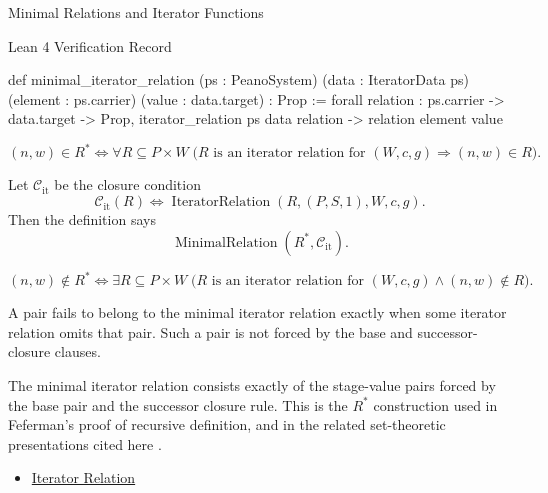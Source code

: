 \begin{topicbox}{Minimal Relations and Iterator Functions}
\begin{formalizationrecord}{Lean 4 Verification Record}
\begin{leancode}
def minimal_iterator_relation
    (ps : PeanoSystem)
    (data : IteratorData ps)
    (element : ps.carrier)
    (value : data.target) : Prop :=
  forall relation : ps.carrier -> data.target -> Prop,
    iterator_relation ps data relation ->
    relation element value
\end{leancode}
\end{formalizationrecord}

\begin{remark*}
\[
(n,w)\in R^*
\Longleftrightarrow
\forall R\subseteq P\times W\;
\bigl(R \text{ is an iterator relation for } (W,c,g)
\Longrightarrow (n,w)\in R\bigr).
\]
\end{remark*}

\begin{remark*}
Let $\mathcal C_{\mathrm{it}}$ be the closure condition
\[
\mathcal C_{\mathrm{it}}(R)
\Longleftrightarrow
\operatorname{IteratorRelation}(R,(P,S,1),W,c,g).
\]
Then the definition says
\[
\operatorname{MinimalRelation}(R^*,\mathcal C_{\mathrm{it}}).
\]
\end{remark*}

\begin{remark*}
\[
(n,w)\notin R^*
\Longleftrightarrow
\exists R\subseteq P\times W\;
\bigl(R \text{ is an iterator relation for } (W,c,g)\land (n,w)\notin R\bigr).
\]
\end{remark*}

\begin{remark*}
A pair fails to belong to the minimal iterator relation exactly when some
iterator relation omits that pair. Such a pair is not forced by the base and
successor-closure clauses.
\end{remark*}

\begin{remark*}[Interpretation]
The minimal iterator relation consists exactly of the stage-value pairs forced
by the base pair and the successor closure rule. This is the $R^*$ construction
used in Feferman's proof of recursive definition, and in the related
set-theoretic presentations cited here
\citep{FefermanNumberSystems1964,hrbacek_jech1999,chi_recursion_wustl}.
\end{remark*}

\begin{dependencies}
\begin{itemize}
  \item \hyperref[def:iterator-relation]{Iterator Relation}
\end{itemize}
\end{dependencies}


\end{topicbox}
